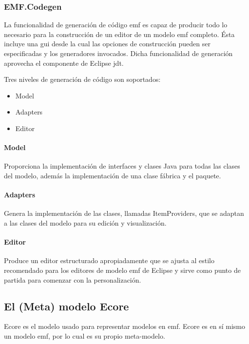 \documentclass[a4paper,12pt,oneside,spanish]{book}
\begin{document}
\subsubsection{EMF.Codegen}

La funcionalidad de generación de código \gls{emf} es capaz de producir todo lo necesario para la construcción de un editor de un modelo \gls{emf} completo. Ésta incluye una \gls{gui} desde la cual las opciones de construcción pueden ser especificadas y los generadores invocados. Dicha funcionalidad de generación aprovecha el componente de \textsf{Eclipse} \gls{jdt}.

Tres niveles de generación de código son soportados: 
\begin{itemize}
\item Model
\item Adapters 
\item Editor
\end{itemize}

\paragraph{Model}

Proporciona la implementación de interfaces y clases \textsf{Java} para todas las clases del modelo, además la implementación de una clase fábrica y el paquete.

\paragraph{Adapters}

Genera la implementación de las clases, llamadas \textsf{ItemProviders}, que se adaptan a las clases del modelo para su edición y visualización.

\paragraph{Editor}

Produce un editor estructurado apropiadamente que se ajusta al estilo recomendado para los editores de modelo \gls{emf} de \textsf{Eclipse} y sirve como punto de partida para comenzar con la personalización.


\subsection{El (Meta) modelo Ecore}

\textsf{Ecore} es el modelo usado para representar modelos en \gls{emf}. \textsf{Ecore} es en sí mismo un modelo \gls{emf}, por lo cual es su propio meta-modelo. 
\end{document}
